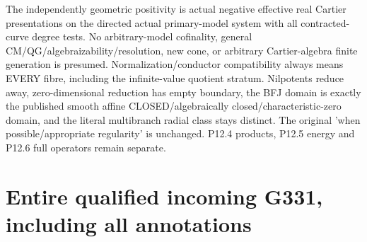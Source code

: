 \documentclass[11pt]{article}
\begin{document}
The independently geometric positivity is actual negative effective real Cartier presentations on the directed actual primary-model system with all contracted-curve degree tests. No arbitrary-model cofinality, general CM/QG/algebraizability/resolution, new cone, or arbitrary Cartier-algebra finite generation is presumed. Normalization/conductor compatibility always means EVERY fibre, including the infinite-value quotient stratum. Nilpotents reduce away, zero-dimensional reduction has empty boundary, the BFJ domain is exactly the published smooth affine CLOSED/algebraically closed/characteristic-zero domain, and the literal multibranch radial class stays distinct. The original 'when possible/appropriate regularity' is unchanged. P12.4 products, P12.5 energy and P12.6 full operators remain separate.

\appendix
\section{Entire qualified incoming G331, including all annotations}
\end{document}

